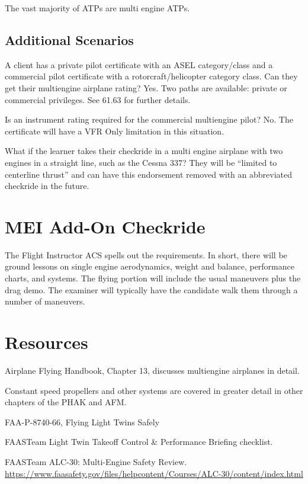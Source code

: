 The vast majority of ATPs are multi engine ATPs.

\subsection{Additional Scenarios}

A client has a private pilot certificate with an ASEL category/class and a commercial pilot
certificate with a rotorcraft/helicopter category class. Can they get their multiengine airplane
rating? Yes. Two paths are available: private or commercial privileges. See 61.63
for further details.

Is an instrument rating required for the commercial multiengine pilot? No. The certificate will have
a VFR Only limitation in this situation.

What if the learner takes their checkride in a multi engine airplane with two engines in a straight line, such as the Cessna 337?
They will be ``limited to centerline thrust'' and
can have this endorsement removed with an abbreviated checkride in the future.

\section{MEI Add-On Checkride}

The Flight Instructor ACS spells out the requirements. In short, there will be ground lessons on
single engine aerodynamics, weight and balance, performance charts, and systems. The flying
portion will include the usual maneuvers plus the drag demo. The examiner will typically have the
candidate walk them through a number of maneuvers.

\section{Resources}

Airplane Flying Handbook, Chapter 13, discusses multiengine airplanes in detail.

Constant speed propellers and other systems are covered in greater detail in other chapters of the PHAK and AFM.

FAA-P-8740-66, Flying Light Twins Safely

FAASTeam Light Twin Takeoff Control \& Performance Briefing checklist.

FAASTeam ALC-30: Multi-Engine Safety Review.\\\url{https://www.faasafety.gov/files/helpcontent/Courses/ALC-30/content/index.html}


